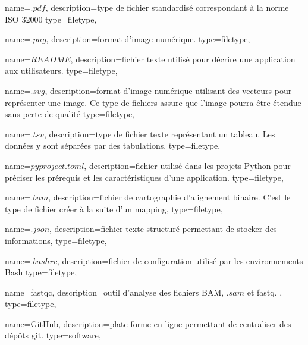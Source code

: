  {
    name=$.pdf$,
    description={type de fichier standardisé correspondant à la norme ISO 32000}
    type=filetype,
}
\newcommand{\pdf}{"\gls{pdf}"}

 {
    name=$.png$,
    description={format d'image numérique.}
    type=filetype,
}
\newcommand{\png}{"\gls{png}"}

 {
    name=$README$,
    description={fichier texte utilisé pour décrire une application aux utilisateurs.}
    type=filetype,
}
\newcommand{\readme}{\gls{readme}}


 {
   name=$.svg$,
    description={format d'image numérique utilisant des vecteurs pour représenter une image. Ce type de fichiers assure que l'image pourra être étendue sans perte de qualité }
    type=filetype,
}
\newcommand{\svg}{"\gls{svg}"}

 {
   name=$.tsv$,
    description={type de fichier texte représentant un tableau. Les données y sont séparées par des tabulations.}
    type=filetype,
}
\newcommand{\tsv}{"\gls{tsv}"}

 {
   name=$pyproject.toml$,
    description={fichier utilisé dans les projets \gls{Python} pour préciser les prérequis et les caractéristiques d'une application.}
    type=filetype,
}

 {
    name=$.bam$,
    description={fichier de cartographie d'alignement binaire. C'est le type de fichier créer à la suite d'un \gls{mapping}},
    type=filetype,
}
\newcommand{\bam}{"\gls{bam}"}

 {
    name=$.json$,
    description={fichier texte structuré permettant de stocker des informations},
    type=filetype,
}
\newcommand{\json}{"\gls{json}"}

 {
    name=$.bashrc$,
    description={fichier de configuration utilisé par les environnements \gls{Bash}}
     type=filetype,
}

 {
    name=fastqc,
    description={outil d'analyse des fichiers \gls{BAM}, $.sam$ et \gls{fastq}. \cite{fastqc}},
    type=filetype,
}
\newcommand{\fastqc}{\gls{fastqc}}

 {
    name=GitHub,
    description={plate-forme en ligne permettant de centraliser des dépôts \gls{git}. \cite{github}}
    type=software,
}
\newcommand{\GitHub}{\gls{GitHub}}

